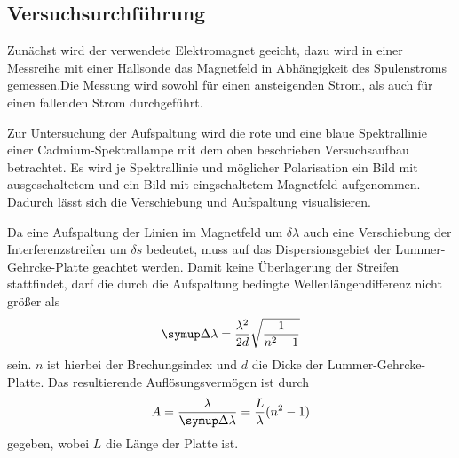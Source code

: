 \subsection{Versuchsurchführung}
Zunächst wird der verwendete Elektromagnet geeicht, dazu wird in einer Messreihe mit einer Hallsonde
das Magnetfeld in Abhängigkeit des Spulenstroms gemessen.Die Messung wird sowohl für einen ansteigenden
Strom, als auch für einen fallenden Strom durchgeführt.

Zur Untersuchung der Aufspaltung wird die rote und eine blaue Spektrallinie einer Cadmium-Spektrallampe
mit dem oben beschrieben Versuchsaufbau betrachtet. Es wird je Spektrallinie und möglicher Polarisation ein Bild
mit ausgeschaltetem und ein Bild mit eingschaltetem Magnetfeld aufgenommen. Dadurch lässt sich die Verschiebung
und Aufspaltung visualisieren.

Da eine Aufspaltung der Linien im Magnetfeld um $\delta\lambda$ auch eine Verschiebung der Interferenzstreifen um $\delta s$
bedeutet, muss auf das Dispersionsgebiet der Lummer-Gehrcke-Platte geachtet werden. Damit keine Überlagerung der Streifen
stattfindet, darf die durch die Aufspaltung bedingte Wellenlängendifferenz nicht größer als
\begin{equation}
    \upD\lambda=\frac{\lambda^2}{2d}\sqrt{\frac{1}{n^2-1}}
\end{equation}
sein.
$n$ ist hierbei der Brechungsindex und $d$ die Dicke der Lummer-Gehrcke-Platte.
Das resultierende Auflösungsvermögen ist durch
\begin{equation}
    A=\frac{\lambda}{\upD\lambda}=\frac{L}{\lambda}(n^2-1)
\end{equation}
gegeben, wobei $L$ die Länge der Platte ist.
